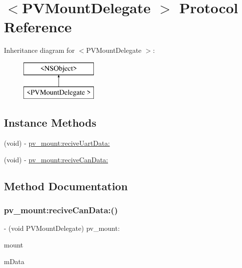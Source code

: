 \hypertarget{protocol_p_v_mount_delegate_01-p}{}\section{$<$P\+V\+Mount\+Delegate $>$ Protocol Reference}
\label{protocol_p_v_mount_delegate_01-p}
Inheritance diagram for $<$P\+V\+Mount\+Delegate $>$\+:\begin{figure}[H]
\begin{center}
\leavevmode
\includegraphics[height=2.000000cm]{protocol_p_v_mount_delegate_01-p}
\end{center}
\end{figure}
\subsection*{Instance Methods}
\begin{DoxyCompactItemize}
\item 
(void) -\/ \hyperlink{protocol_p_v_mount_delegate_01-p_a79e3b6418e0acd5c23c5df615bdef34f}{pv\+\_\+mount\+:recive\+Uart\+Data\+:}
\item 
(void) -\/ \hyperlink{protocol_p_v_mount_delegate_01-p_a7aacab18106a4a6781214ac7a6d20c10}{pv\+\_\+mount\+:recive\+Can\+Data\+:}
\end{DoxyCompactItemize}


\subsection{Method Documentation}
\mbox{\label{protocol_p_v_mount_delegate_01-p_a7aacab18106a4a6781214ac7a6d20c10}} 
\subsubsection{\texorpdfstring{pv\+\_\+mount\+:recive\+Can\+Data\+:()}{pv\_mount:reciveCanData:()}}
{\footnotesize\ttfamily -\/ (void P\+V\+Mount\+Delegate) pv\+\_\+mount\+: \begin{DoxyParamCaption}\item[{(\hyperlink{interface_p_v_mount}{P\+V\+Mount} $\ast$\+\_\+\+Nonnull)}]{mount }\item[{reciveCanData:(\hyperlink{struct_p_v_s_d_k___m_o_u_n_t_a_p_i___c_a_n___d_a_t_a}{P\+V\+S\+D\+K\+\_\+\+M\+O\+U\+N\+T\+A\+P\+I\+\_\+\+C\+A\+N\+\_\+\+D\+A\+TA})}]{m\+Data }\end{DoxyParamCaption}}

